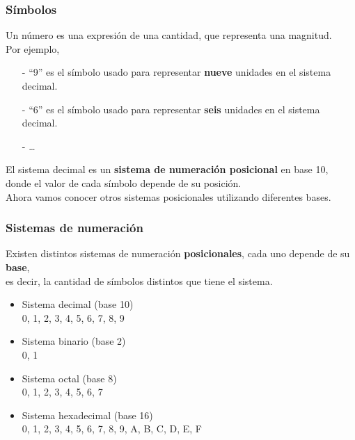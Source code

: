 \documentclass[aspectratio=169]{beamer}
\begin{document}
\begin{frame}[fragile]
    \frametitle{Símbolos}
    Un número es una expresión de una cantidad, que representa una magnitud.\\
    \vspace{5px}
    Por ejemplo,
    \begin{itemize}
     \item[-] ``9'' es el símbolo usado para representar \textbf{nueve} unidades en el sistema decimal.
     \item[-] ``6'' es el símbolo usado para representar \textbf{seis} unidades en el sistema decimal.
     \item[-] \dots
    \end{itemize}
    \vspace{15px}
    El sistema decimal es un \textbf{sistema de numeración posicional} en base 10,\\
    donde el valor de cada símbolo depende de su posición.\\
    \vspace{10px}
    Ahora vamos conocer otros sistemas posicionales utilizando diferentes bases.
\end{frame}

\begin{frame}[fragile]
    \frametitle{Sistemas de numeración}
    Existen distintos sistemas de numeración \textbf{posicionales}, cada uno depende de su \textbf{base},\\
    es decir, la cantidad de símbolos distintos que tiene el sistema.
    \vspace{0.2cm}
    \begin{itemize}
    \setlength\itemsep{10px}
    \item Sistema \textcolor{naranjauca}{decimal} (base 10)\\ \hspace{5cm} { \large {0, 1, 2, 3, 4, 5, 6, 7, 8, 9} }
    \item Sistema \textcolor{naranjauca}{binario} (base 2)\\ \hspace{5cm} { \large {0, 1} }
    \item Sistema \textcolor{naranjauca}{octal} (base 8)\\ \hspace{5cm} { \large {0, 1, 2, 3, 4, 5, 6, 7} }
    \item Sistema \textcolor{naranjauca}{hexadecimal} (base 16)\\ \hspace{5cm} { \large {0, 1, 2, 3, 4, 5, 6, 7, 8, 9, A, B, C, D, E, F} }
    \end{itemize}
\end{frame}
\end{document}

